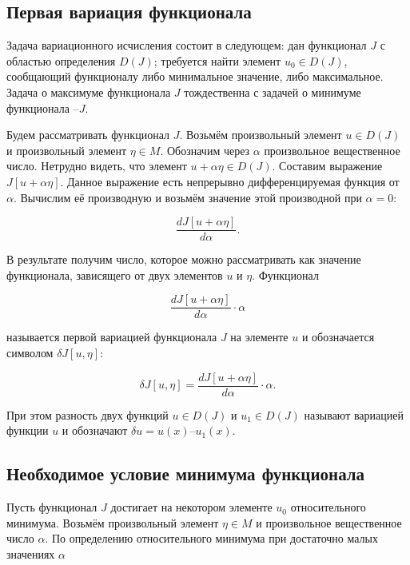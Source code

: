 \documentclass{article}
\begin{document}
\subsection{Первая вариация функционала}

Задача вариационного исчисления состоит в следующем: дан функционал $J$ с областью определения $D(J)$; требуется найти элемент $u_{0} \in D(J)$, сообщающий функционалу либо минимальное значение, либо максимальное. Задача о максимуме функционала $J$ тождественна с задачей о минимуме функционала $\text{--} J$.

Будем рассматривать функционал $J$. Возьмём произвольный элемент $u \in D(J)$ и произвольный элемент $\eta \in M $. Обозначим через $\alpha$ произвольное вещественное число. Нетрудно видеть, что элемент $ u + \alpha \eta \in D(J)$. Составим выражение $J[u + \alpha \eta]$. Данное выражение есть непрерывно дифференцируемая функция от $\alpha$. Вычислим её производную и возьмём значение этой производной при $\alpha = 0$:

\begin{equation}
    \frac{dJ[u + \alpha \eta]}{d\alpha}.
\end{equation}

\noindent В результате получим число, которое можно рассматривать как значение функционала, зависящего от двух элементов $u$ и $\eta$. Функционал

\begin{equation}
    \frac{dJ[u + \alpha \eta]}{d\alpha} \cdot \alpha
\end{equation}

\noindent называется первой вариацией функционала $J$ на элементе $u$ и обозначается символом $\delta J[u, \eta]$:

\begin{equation}
     \delta J[u, \eta] = \frac{dJ[u + \alpha \eta]}{d\alpha} \cdot \alpha.
\end{equation}

\noindent При этом разность двух функций $u \in D(J)$ и $u_{1} \in D(J)$ называют вариацией функции $u$ и обозначают $\delta u = u(x) \text{--} u_{1}(x)$.

\subsection{Необходимое условие минимума функционала}\label{
sub_section_minimum_conditions}

Пусть функционал $J$ достигает на некотором элементе $u_{0}$ относительного минимума. Возьмём произвольный элемент $\eta \in M$ и произвольное вещественное число $\alpha$. По определению относительного минимума при достаточно малых значениях $\alpha$
\end{document}
